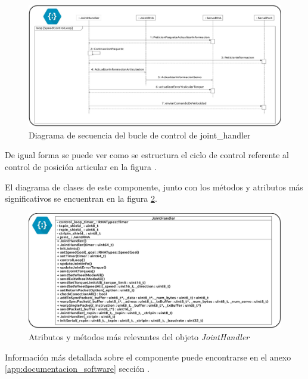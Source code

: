         \begin{figure}[H]
            \centering
            \includegraphics[width=1\textwidth]{figuras/Imagenes_SW/diagrama_secuencia_speed_control.jpg}
            \caption{Diagrama de secuencia del bucle de control de joint\_handler  }
            \label{fig:SW:joint_handler_loop}
        \end{figure}

        De igual forma se puede ver como se estructura el ciclo de control referente al control de posición articular en la figura \completar.

        El diagrama de clases de este componente, junto con los métodos y atributos más significativos se encuentran en la figura \ref{fig:SW:class_diagram_JH}.

        \begin{figure}[H]
            \centering
            \includegraphics[width=1\textwidth]{figuras/Imagenes_SW/class_diagram_JH.jpg}
            \caption{Atributos y métodos más relevantes del objeto \textit{JointHandler}}
            \label{fig:SW:class_diagram_JH}
        \end{figure}

        Información más detallada sobre el componente puede encontrarse en el anexo \ref{app:documentacion_software} sección \completar.
